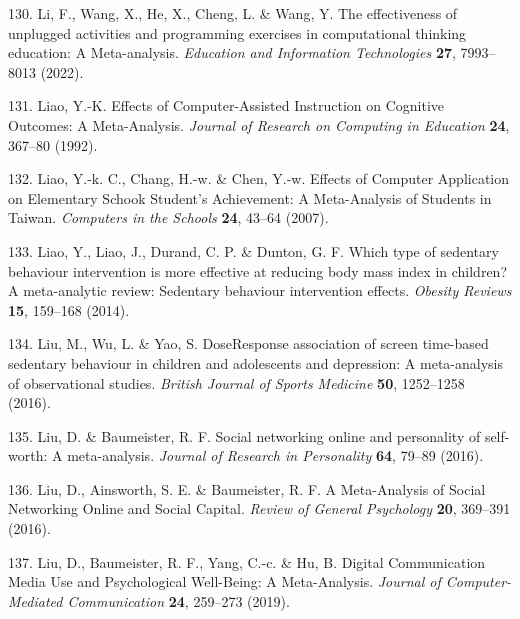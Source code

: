 \documentclass[
  english,
  man]{apa6}
\newenvironment{cslreferences}%
  {}%
  {\par}
\begin{document}
\begin{cslreferences}
\leavevmode\hypertarget{ref-liEffectivenessUnpluggedActivities2022}{}%
130. Li, F., Wang, X., He, X., Cheng, L. \& Wang, Y. The effectiveness of unplugged activities and programming exercises in computational thinking education: A Meta-analysis. \emph{Education and Information Technologies} \textbf{27}, 7993--8013 (2022).

\leavevmode\hypertarget{ref-liaoEffectsComputerassistedInstruction1992}{}%
131. Liao, Y.-K. Effects of Computer-Assisted Instruction on Cognitive Outcomes: A Meta-Analysis. \emph{Journal of Research on Computing in Education} \textbf{24}, 367--80 (1992).

\leavevmode\hypertarget{ref-liaoEffectsComputerApplications2007}{}%
132. Liao, Y.-k. C., Chang, H.-w. \& Chen, Y.-w. Effects of Computer Application on Elementary Schook Student's Achievement: A Meta-Analysis of Students in Taiwan. \emph{Computers in the Schools} \textbf{24}, 43--64 (2007).

\leavevmode\hypertarget{ref-liaoWhichTypeSedentary2014}{}%
133. Liao, Y., Liao, J., Durand, C. P. \& Dunton, G. F. Which type of sedentary behaviour intervention is more effective at reducing body mass index in children? A meta-analytic review: Sedentary behaviour intervention effects. \emph{Obesity Reviews} \textbf{15}, 159--168 (2014).

\leavevmode\hypertarget{ref-liuDoseResponseAssociation2016}{}%
134. Liu, M., Wu, L. \& Yao, S. DoseResponse association of screen time-based sedentary behaviour in children and adolescents and depression: A meta-analysis of observational studies. \emph{British Journal of Sports Medicine} \textbf{50}, 1252--1258 (2016).

\leavevmode\hypertarget{ref-liuSocialNetworkingOnline2016}{}%
135. Liu, D. \& Baumeister, R. F. Social networking online and personality of self-worth: A meta-analysis. \emph{Journal of Research in Personality} \textbf{64}, 79--89 (2016).

\leavevmode\hypertarget{ref-liuMetaanalysisSocialNetworking2016}{}%
136. Liu, D., Ainsworth, S. E. \& Baumeister, R. F. A Meta-Analysis of Social Networking Online and Social Capital. \emph{Review of General Psychology} \textbf{20}, 369--391 (2016).

\leavevmode\hypertarget{ref-liuDigitalCommunicationMedia2019}{}%
137. Liu, D., Baumeister, R. F., Yang, C.-c. \& Hu, B. Digital Communication Media Use and Psychological Well-Being: A Meta-Analysis. \emph{Journal of Computer-Mediated Communication} \textbf{24}, 259--273 (2019).


\end{cslreferences}
\end{document}
